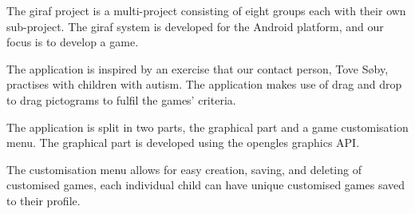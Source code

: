 The \ac{giraf} project is a multi-project consisting of eight groups each with their own sub-project. The \ac{giraf} system is developed for the Android platform, and our focus is to develop a game.

The application is inspired by an exercise that our contact person, Tove Søby, practises with children with autism. The application makes use of drag and drop to drag pictograms to fulfil the games' criteria.

The application is split in two parts, the graphical part and a game customisation menu. The graphical part is developed using the \acl{opengles} graphics API.

The customisation menu allows for easy creation, saving, and deleting of customised games, each individual child can have unique customised games saved to their profile.